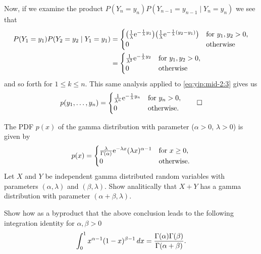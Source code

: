 \begin{solution*}
  Now, if we examine the product \(P(Y_n=y_n)P(Y_{n-1}=y_{n-1}\mid
  Y_n=y_n)\) we see that
  \[
    \begin{aligned}
      P(Y_1=y_1)P(Y_2=y_2\mid Y_1=y_1)&=%
      \begin{cases}
        \bigl(\frac{1}{\lambda}\rme^{-\frac{1}{\lambda}y_1}\bigr)%
        \bigl(\frac{1}{\lambda}\rme^{-\frac{1}{\lambda}(y_2-y_1)}\bigr)
        &\text{for \(y_1,y_2>0\),}\\
        0&\text{otherwise}
      \end{cases}\\
      &=\begin{cases}
        \frac{1}{\lambda^2}\rme^{-\frac{1}{\lambda}y_2}
        &\text{for \(y_1,y_2>0\),}\\
        0&\text{otherwise}
    \end{cases}
  \end{aligned}
  \]
  and so forth for \(1\leq k\leq n\). This same analysis applied to
  \eqref{eq:yip:mid-2:3} gives us
  \[
    p(y_1,\dotsc,y_n)=
    \begin{cases}
      \frac{1}{\lambda^n}\mathrm{e}^{-\frac{1}{\lambda}y_n}&\text{for \(y_n>0\),}\\
      0&\text{otherwise.}
    \end{cases}\qedhere
  \]
\end{solution*}

\begin{problem}
  The PDF \(p(x)\) of the gamma distribution with parameter (\(\alpha>0\),
  \(\lambda>0\)) is given by
  \[
    p(x)=
    \begin{cases}
      \frac{\lambda}{\Gamma(\alpha)}\mathrm{e}^{-\lambda x}(\lambda x)^{\alpha
        -1}
      &\text{for \(x\geq 0\),}\\
      0&\text{otherwise.}
    \end{cases}
  \]
  Let \(X\) and \(Y\) be independent gamma distributed random variables
  with parameters \((\alpha,\lambda)\) and \((\beta,\lambda)\). Show
  analitically that \(X+Y\) has a gamma distribution with parameter
  \((\alpha+\beta,\lambda)\).

  Show how as a byproduct that the above conclusion leads to the following
  integration identity for \(\alpha,\beta>0\)
  \[
    \int_0^1 x^{\alpha-1}(1-x)^{\beta-1}\mathop{}\!d x
    =\frac{\Gamma(\alpha)\Gamma(\beta)}{\Gamma(\alpha+\beta)}.
  \]
\end{problem}
\begin{solution*}
\end{solution*}

